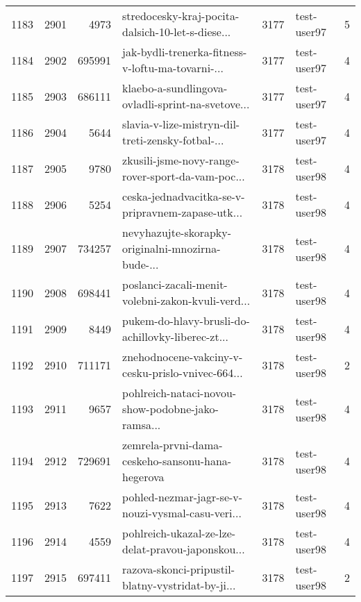 \begin{tabular}{lrrlrlr}
1183 &       2901 &     4973 &  stredocesky-kraj-pocita-dalsich-10-let-s-diese... &     3177 &                  test-user97 &               5 \\
1184 &       2902 &   695991 &  jak-bydli-trenerka-fitness-v-loftu-ma-tovarni-... &     3177 &                  test-user97 &               4 \\
1185 &       2903 &   686111 &  klaebo-a-sundlingova-ovladli-sprint-na-svetove... &     3177 &                  test-user97 &               4 \\
1186 &       2904 &     5644 &  slavia-v-lize-mistryn-dil-treti-zensky-fotbal-... &     3177 &                  test-user97 &               4 \\
1187 &       2905 &     9780 &  zkusili-jsme-novy-range-rover-sport-da-vam-poc... &     3178 &                  test-user98 &               4 \\
1188 &       2906 &     5254 &  ceska-jednadvacitka-se-v-pripravnem-zapase-utk... &     3178 &                  test-user98 &               4 \\
1189 &       2907 &   734257 &  nevyhazujte-skorapky-originalni-mnozirna-bude-... &     3178 &                  test-user98 &               4 \\
1190 &       2908 &   698441 &  poslanci-zacali-menit-volebni-zakon-kvuli-verd... &     3178 &                  test-user98 &               4 \\
1191 &       2909 &     8449 &  pukem-do-hlavy-brusli-do-achillovky-liberec-zt... &     3178 &                  test-user98 &               4 \\
1192 &       2910 &   711171 &  znehodnocene-vakciny-v-cesku-prislo-vnivec-664... &     3178 &                  test-user98 &               2 \\
1193 &       2911 &     9657 &  pohlreich-nataci-novou-show-podobne-jako-ramsa... &     3178 &                  test-user98 &               4 \\
1194 &       2912 &   729691 &   zemrela-prvni-dama-ceskeho-sansonu-hana-hegerova &     3178 &                  test-user98 &               4 \\
1195 &       2913 &     7622 &  pohled-nezmar-jagr-se-v-nouzi-vysmal-casu-veri... &     3178 &                  test-user98 &               4 \\
1196 &       2914 &     4559 &  pohlreich-ukazal-ze-lze-delat-pravou-japonskou... &     3178 &                  test-user98 &               4 \\
1197 &       2915 &   697411 &  razova-skonci-pripustil-blatny-vystridat-by-ji... &     3178 &                  test-user98 &               2 \\

\end{tabular}
